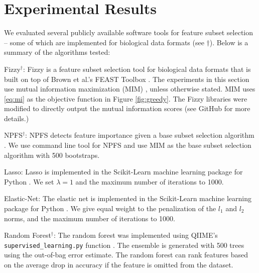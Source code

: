 \documentclass{acm_proc_article-sp}
\begin{document}
\section{Experimental Results}
\label{sec:exp}


We evaluated several publicly available software tools for feature subset selection -- some of which are  implemented for biological data formats (see ${\dagger}$). Below is a summary of the algorithms tested: 
\begin{mitemize}
\item {\sf Fizzy}$^{\dagger}$: Fizzy is a feature subset selection tool for biological data formats that is built on  top of Brown et al.'s FEAST Toolbox \cite{Brown2012JMLR}. The experiments in this section use mutual information maximization (MIM) \cite{Lewis1992MIM}, unless otherwise stated. MIM uses \eqref{eq:mi} as the objective function in Figure \ref{fig:greedy}. The Fizzy libraries were modified to directly output the mutual information scores (see GitHub for more details.)
\item {\sf NPFS}$^{\dagger}$: NPFS detects feature importance given a base subset selection algorithm \cite{Ditzler2014TNNLS}. We use command line tool for NPFS and use MIM as the base subset selection algorithm with 500 bootstraps.  
\item {\sf Lasso}: Lasso is implemented in the Scikit-Learn machine learning package for Python \cite{scikit-learn}. We set $\lambda=1$ and the maximum number of iterations to 1000. 
\item {\sf Elastic-Net}: The elastic net is implemented in the Scikit-Learn machine learning package for Python \cite{scikit-learn}. We give equal weight to the penalization of the $l_1$ and $l_2$ norms, and the maximum number of iterations to 1000.
\item {\sf Random Forest}$^{\dagger}$: The random forest was implemented using QIIME's {\tt supervised\_learning.py} function  \cite{Caporaso2010NM}. The ensemble is generated with 500 trees using the out-of-bag error estimate. The random forest can rank features based on the average drop in accuracy if the feature is omitted from the dataset. 
\end{mitemize}
\end{document}
